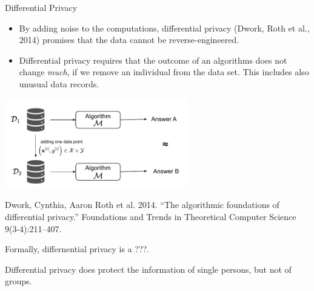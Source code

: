 \begin{vbframe}{Differential Privacy}
\begin{itemize}
\item By adding noise to the computations, differential privacy (Dwork, Roth et al., 2014) promises that the data cannot be reverse-engineered.
\item Differential privacy requires that the outcome of an algorithms does not change \textit{much}, if we remove an individual from the data set. This includes also unusual data records.
\end{itemize}

\begin{center}
\includegraphics[width=0.6\textwidth]{figure_man/privacy-differential.pdf}
\end{center}
\vfill
\begin{tiny}
\begin{singlespace}
Dwork, Cynthia, Aaron Roth et al. 2014. “The algorithmic foundations of differential privacy.” Foundations and Trends in Theoretical Computer Science 9(3-4):211–407.
\end{singlespace}
\end{tiny}
\framebreak

Formally, differnential privacy is a ???.

Differential privacy does protect the information of single persons, but not of groups. 

\end{vbframe}
\endlecture


